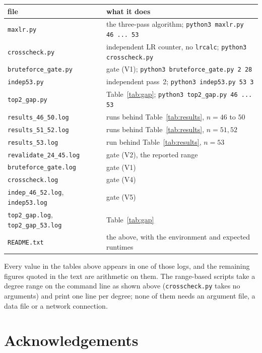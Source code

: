 \documentclass[11pt]{article}
\theoremstyle{remark}
\begin{document}
\begin{center}
\small
\begin{tabular}{ll}
\toprule
file & what it does \\
\midrule
\texttt{maxlr.py} & the three-pass algorithm; \texttt{python3 maxlr.py 46 ... 53} \\
\texttt{crosscheck.py} & independent LR counter, no \texttt{lrcalc}; \texttt{python3 crosscheck.py} \\
\texttt{bruteforce\_gate.py} & gate (V1); \texttt{python3 bruteforce\_gate.py 2 28} \\
\texttt{indep53.py} & independent pass~2; \texttt{python3 indep53.py 53 3} \\
\texttt{top2\_gap.py} & Table~\ref{tab:gap}; \texttt{python3 top2\_gap.py 46 ... 53} \\
\texttt{results\_46\_50.log} & runs behind Table~\ref{tab:results}, $n=46$ to $50$ \\
\texttt{results\_51\_52.log} & runs behind Table~\ref{tab:results}, $n=51,52$ \\
\texttt{results\_53.log} & run behind Table~\ref{tab:results}, $n=53$ \\
\texttt{revalidate\_24\_45.log} & gate (V2), the reported range \\
\texttt{bruteforce\_gate.log} & gate (V1) \\
\texttt{crosscheck.log} & gate (V4) \\
\texttt{indep\_46\_52.log}, \texttt{indep53.log} & gate (V5) \\
\texttt{top2\_gap.log}, \texttt{top2\_gap\_53.log} & Table~\ref{tab:gap} \\
\texttt{README.txt} & the above, with the environment and expected runtimes \\
\bottomrule
\end{tabular}
\end{center}

\noindent
Every value in the tables above appears in one of those logs, and the remaining figures
quoted in the text are arithmetic on them. The range-based scripts take a degree range
on the command line as shown above (\texttt{crosscheck.py} takes no arguments) and
print one line per degree; none of them needs an argument file, a data
file or a network connection.

\section*{Acknowledgements}
\end{document}

